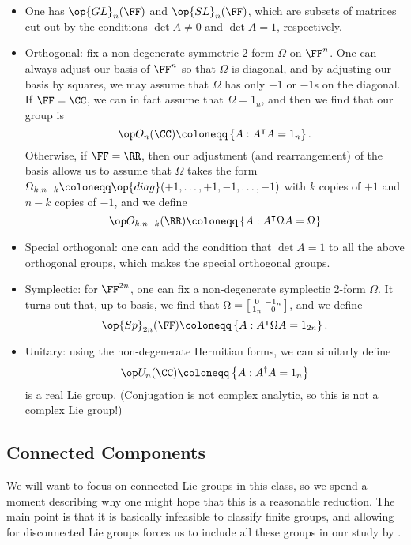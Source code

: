 \documentclass[../notes.tex]{subfiles}
\begin{document}
\begin{itemize}
	\item One has $\op{GL}_n(\FF)$ and $\op{SL}_n(\FF)$, which are subsets of matrices cut out by the conditions $\det A\ne0$ and $\det A=1$, respectively.
	\item Orthogonal: fix a non-degenerate symmetric $2$-form $\Omega$ on $\FF^n$. One can always adjust our basis of $\FF^n$ so that $\Omega$ is diagonal, and by adjusting our basis by squares, we may assume that $\Omega$ has only $+1$ or $-1$s on the diagonal. If $\FF=\CC$, we can in fact assume that $\Omega=1_n$, and then we find that our group is
	\[\op O_n(\CC)\coloneqq\left\{A:A^\intercal A=1_n\right\}.\]
	Otherwise, if $\FF=\RR$, then our adjustment (and rearrangement) of the basis allows us to assume that $\Omega$ takes the form $\Omega_{k,n-k}\coloneqq\op{diag}(+1,\ldots,+1,-1,\ldots,-1)$ with $k$ copies of $+1$ and $n-k$ copies of $-1$, and we define
	\[\op O_{k,n-k}(\RR)\coloneqq\left\{A:A^\intercal\Omega A=\Omega\right\}\]
	\item Special orthogonal: one can add the condition that $\det A=1$ to all the above orthogonal groups, which makes the special orthogonal groups.
	\item Symplectic: for $\FF^{2n}$, one can fix a non-degenerate symplectic $2$-form $\Omega$. It turns out that, up to basis, we find that $\Omega=\begin{bsmallmatrix}
		0 & -1_n \\ 1_n & 0
	\end{bsmallmatrix}$, and we define
	\[\op{Sp}_{2n}(\FF)\coloneqq\left\{A:A^\intercal\Omega A=1_{2n}\right\}.\]
	\item Unitary: using the non-degenerate Hermitian forms, we can similarly define
	\[\op U_n(\CC)\coloneqq\left\{A:A^\dagger A=1_n\right\}\]
	is a real Lie group. (Conjugation is not complex analytic, so this is not a complex Lie group!)
\end{itemize}

\subsection{Connected Components}
We will want to focus on connected Lie groups in this class, so we spend a moment describing why one might hope that this is a reasonable reduction. The main point is that it is basically infeasible to classify finite groups, and allowing for disconnected Lie groups forces us to include all these groups in our study by .
\end{document}
